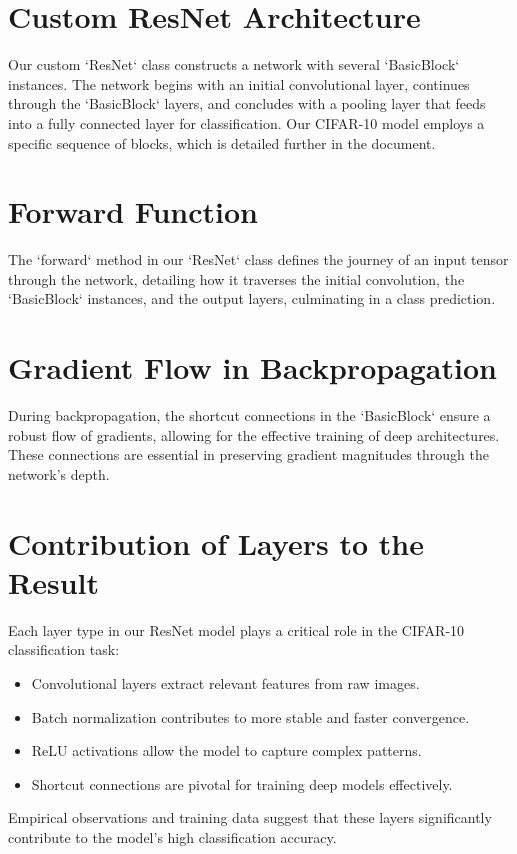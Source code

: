 \documentclass{article}
\begin{document}
\section{Custom ResNet Architecture}
Our custom `ResNet` class constructs a network with several `BasicBlock` instances. The network begins with an initial convolutional layer, continues through the `BasicBlock` layers, and concludes with a pooling layer that feeds into a fully connected layer for classification. Our CIFAR-10 model employs a specific sequence of blocks, which is detailed further in the document.

\section{Forward Function}
The `forward` method in our `ResNet` class defines the journey of an input tensor through the network, detailing how it traverses the initial convolution, the `BasicBlock` instances, and the output layers, culminating in a class prediction.

\section{Gradient Flow in Backpropagation}
During backpropagation, the shortcut connections in the `BasicBlock` ensure a robust flow of gradients, allowing for the effective training of deep architectures. These connections are essential in preserving gradient magnitudes through the network's depth.

\section{Contribution of Layers to the Result}
Each layer type in our ResNet model plays a critical role in the CIFAR-10 classification task:
\begin{itemize}
    \item Convolutional layers extract relevant features from raw images.
    \item Batch normalization contributes to more stable and faster convergence.
    \item ReLU activations allow the model to capture complex patterns.
    \item Shortcut connections are pivotal for training deep models effectively.
\end{itemize}
Empirical observations and training data suggest that these layers significantly contribute to the model's high classification accuracy.
\end{document}
